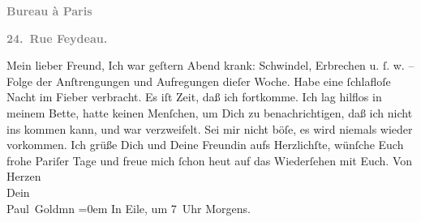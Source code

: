 \begin{ledgroupsized}[t]{13cm}
           \pstart
           \begin{otherlanguage}{french}\textcolor{gray}{\textbf{\textbf{Bureau à Paris}}}\end{otherlanguage}\pend
           \pstart
           \begin{otherlanguage}{french}\textcolor{gray}{\textbf{\textbf{24. Rue Feydeau.}}}\end{otherlanguage}\pend
           \pstart\center{}Mein lieber Freund,\pend\pstart
           Ich war geſtern{ }Abend krank: Schwindel, Erbrechen u. ſ. w. – Folge der Anſtrengungen und
               Aufregungen dieſer Woche. Habe eine ſchlafloſe Nacht im Fieber verbracht. Es iſt
               Zeit, daß ich fortkomme. Ich lag hilflos in meinem Bette, hatte keinen Menſchen, um
               Dich zu benachrichtigen, daß ich nicht ins \label{K_L02808-1v}\label{K_L02808-1h} kommen kann, und
               war verzweifelt. Sei mir nicht böſe, es wird niemals wieder vorkommen.\pend
           \pstart
           Ich grüße Dich und Deine {\pb}Freundin aufs Herzlichſte,
               wünſche Euch frohe Pariſer Tage und freue mich
               ſchon heut auf das Wiederſehen mit Euch.\pend
           \pstart
           Von Herzen {\\[\baselineskip]}Dein {\\[\baselineskip]}\spacefill\mbox{Paul Goldmn}\pend
           \leftskip=0em{}\pstart
           \noindent{}In Eile, um 7 Uhr Morgens.\pend
           
         
         \endnumbering{}\end{ledgroupsized}  \newcommand{\dateiname}{L02808}\newcommand{\titel}{Paul Goldmann an Arthur Schnitzler, 17. 4. [1897]}\newcommand{\editorInnen}{Martin Anton Müller und Laura Untner}
      